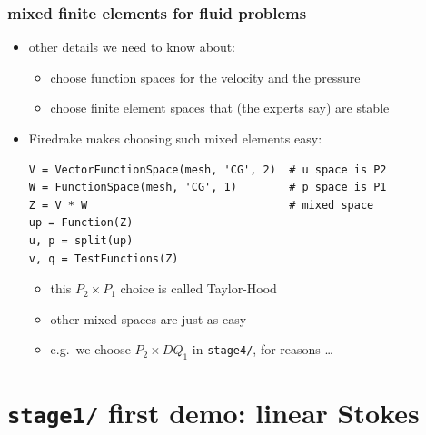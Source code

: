 \documentclass[10pt,
               hyperref={colorlinks,citecolor=DeepPink4,linkcolor=black,urlcolor=blue},
               svgnames]{beamer}
\begin{document}
\begin{frame}[fragile]
\frametitle{mixed finite elements for fluid problems}

\begin{itemize}
\item other details we need to know about:
    \begin{itemize}
    \item[{\color{black} 1.}] choose \alert{function spaces} for the velocity and the pressure
    \item[{\color{black} 2.}] choose finite element spaces that (the experts say) are \alert{stable}
    \end{itemize}

\bigskip
\item Firedrake makes choosing such \alert{mixed elements} easy:

\medskip
\begin{Verbatim}[fontsize=\small]
V = VectorFunctionSpace(mesh, 'CG', 2)  # u space is P2
W = FunctionSpace(mesh, 'CG', 1)        # p space is P1
Z = V * W                               # mixed space
up = Function(Z)
u, p = split(up)
v, q = TestFunctions(Z)
\end{Verbatim}

\medskip
    \begin{itemize}
    \item[$\circ$] this $P_2 \times P_1$ choice is called Taylor-Hood
    \item[$\circ$] other mixed spaces are just as easy
    \item[$\circ$] e.g.~we choose $P_2\times DQ_1$ in \texttt{stage4/}, for reasons \dots
    \end{itemize}
\end{itemize}
\end{frame}



\section{\texorpdfstring{\texttt{stage1/} \qquad}{stage1/ }first demo: linear Stokes}
\end{document}
